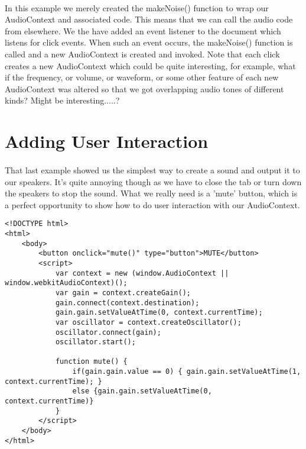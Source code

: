 \paragraph{} In this example we merely created the makeNoise() function to wrap our AudioContext and associated code. This means that we can call the audio code from elsewhere. We the have added an event listener to the document which listens for click events. When such an event occurs, the makeNoise() function is called and a new AudioContext is created and invoked. Note that each click creates a new AudioContext which could be quite interesting, for example, what if the frequency, or volume, or waveform, or some other feature of each new AudioContext was altered so that we got overlapping audio tones of different kinds? Might be interesting.....?


\section{Adding User Interaction}
\paragraph{} That last example showed us the simplest way to create a sound and output it to our speakers. It's quite annoying though as we have to close the tab or turn down the speakers to stop the sound. What we really need is a 'mute' button, which is a perfect opportunity to show how to do user interaction with our AudioContext.

\begin{lstlisting}
<!DOCTYPE html>
<html>
    <body>
        <button onclick="mute()" type="button">MUTE</button>
        <script>
            var context = new (window.AudioContext || window.webkitAudioContext)();
            var gain = context.createGain();
            gain.connect(context.destination);
            gain.gain.setValueAtTime(0, context.currentTime);
            var oscillator = context.createOscillator();
            oscillator.connect(gain);
            oscillator.start();

            function mute() {
                if(gain.gain.value == 0) { gain.gain.setValueAtTime(1, context.currentTime); }
                else {gain.gain.setValueAtTime(0, context.currentTime)}
            }
        </script>
    </body>
</html>
\end{lstlisting}

